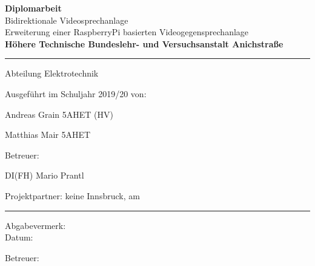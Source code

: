 \documentclass[twoside]{article}
\newcommand{\blankpage}{
	\newpage
	\null
	\thispagestyle{none}
	\newpage
}
\begin{document}
\begin{titlepage}
	\thispagestyle{title}
	\begin{center}
		\vspace*{2cm}
		\Huge\textbf{Diplomarbeit}\\
		\vspace*{2cm}
		\huge Bidirektionale Videosprechanlage\\
		\vspace*{0.5cm}
		\normalsize Erweiterung einer RaspberryPi basierten Videogegensprechanlage\\
		\vspace*{1.5cm}
		\textbf{Höhere Technische Bundeslehr- und Versuchsanstalt Anichstraße}\\
		\vspace*{0.5cm}
		\hrule
		\vspace*{0.5cm}
		Abteilung Elektrotechnik\\
		\vspace*{1cm}
	\end{center}
	\begin{multicols}{2}
		Ausgeführt im Schuljahr 2019/20 von:\bigskip\par
		Andreas Grain 5AHET (HV)\par
		Matthias Mair 5AHET\par	
		\columnbreak	
		Betreuer:\bigskip\par
		DI(FH) Mario Prantl\par
	\end{multicols}
	Projektpartner: keine
	\vskip 1.5cm
	Innsbruck, am \DTMnow
	\vskip 1.5cm
	\hrule
	\vspace*{1cm}
	\begin{multicols}{2}
		Abgabevermerk:\\
		Datum:
		
		\columnbreak
		
		Betreuer:
	\end{multicols}
	\restoregeometry
\end{titlepage}
\blankpage

\tableofcontents
\newpage

\begin{abstract}
	
\end{abstract}
\begin{otherlanguage}{british}
\begin{abstract}
	
\end{abstract}
\end{otherlanguage}
\blankpage
\end{document}
